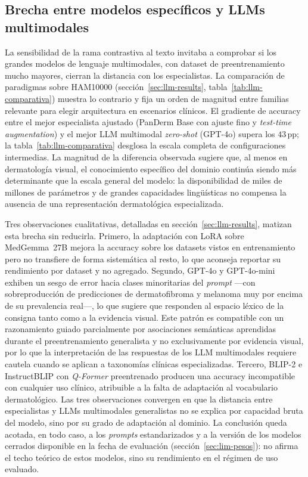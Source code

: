 \subsection{Brecha entre modelos específicos y LLMs multimodales}
\label{sec:disc-llm}

La sensibilidad de la rama contrastiva al texto invitaba a
comprobar si los grandes modelos de lenguaje multimodales, con
dataset de preentrenamiento mucho mayores, cierran la distancia con
los especialistas. La comparación de paradigmas sobre HAM10000
(sección~\ref{sec:llm-results}, tabla~\ref{tab:llm-comparativa})
muestra lo contrario y fija un orden de magnitud entre familias
relevante para elegir arquitectura en escenarios clínicos. El
gradiente de accuracy entre el mejor especialista ajustado (PanDerm
Base con ajuste fino y \emph{test-time augmentation}) y el mejor LLM
multimodal \emph{zero-shot} (GPT-4o) supera los $43$\,pp; la
tabla~\ref{tab:llm-comparativa} desglosa la escala completa de
configuraciones intermedias. La magnitud de la diferencia observada
sugiere que, al menos en dermatología visual, el conocimiento específico
del dominio continúa siendo más determinante que la escala general del
modelo: la disponibilidad de miles de millones de parámetros y de
grandes capacidades lingüísticas no compensa la ausencia de una
representación dermatológica especializada.

Tres observaciones cualitativas, detalladas en
sección~\ref{sec:llm-results}, matizan esta brecha sin reducirla.
Primero, la adaptación con LoRA sobre MedGemma~27B mejora la accuracy
sobre los datasets vistos en entrenamiento pero no transfiere de forma
sistemática al resto, lo que aconseja reportar su rendimiento por dataset
y no agregado. Segundo, GPT-4o y GPT-4o-mini exhiben un sesgo de error
hacia clases minoritarias del \emph{prompt} ---con sobreproducción de
predicciones de dermatofibroma y melanoma muy por encima de su prevalencia
real---, lo que sugiere que responden al espacio léxico de la consigna
tanto como a la evidencia visual. Este patrón es compatible con un
razonamiento guiado parcialmente por asociaciones semánticas aprendidas
durante el preentrenamiento generalista y no exclusivamente por evidencia
visual, por lo que la interpretación de las respuestas de los LLM
multimodales requiere cautela cuando se aplican a taxonomías clínicas
especializadas. Tercero, BLIP-2 e InstructBLIP con
\emph{Q-Former} preentrenado producen una accuracy incompatible con
cualquier uso clínico, atribuible a la falta de adaptación al vocabulario
dermatológico. Las tres observaciones convergen en que la distancia entre
especialistas y LLMs multimodales generalistas no se explica por capacidad
bruta del modelo, sino por su grado de adaptación al dominio. La
conclusión queda acotada, en todo caso, a los \emph{prompts}
estandarizados y a la versión de los modelos cerrados disponible en la
fecha de evaluación (sección~\ref{sec:lim-pesos}): no afirma el techo
teórico de estos modelos, sino su rendimiento en el régimen de uso
evaluado.

